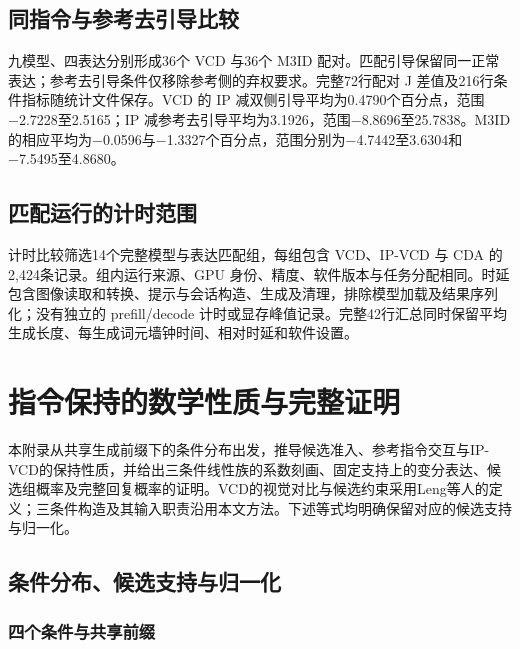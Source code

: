 \subsection{同指令与参考去引导比较}\label{ux540cux6307ux4ee4ux4e0eux53c2ux8003ux53bbux5f15ux5bfcux6bd4ux8f83}

九模型、四表达分别形成36个 VCD 与36个 M3ID 配对。匹配引导保留同一正常表达；参考去引导条件仅移除参考侧的弃权要求。完整72行配对 J 差值及216行条件指标随统计文件保存。VCD 的 IP 减双侧引导平均为0.4790个百分点，范围−2.7228至2.5165；IP 减参考去引导平均为3.1926，范围−8.8696至25.7838。M3ID 的相应平均为−0.0596与−1.3327个百分点，范围分别为−4.7442至3.6304和−7.5495至4.8680。

\subsection{匹配运行的计时范围}\label{ux5339ux914dux8fd0ux884cux7684ux8ba1ux65f6ux8303ux56f4}

计时比较筛选14个完整模型与表达匹配组，每组包含 VCD、IP-VCD 与 CDA 的2,424条记录。组内运行来源、GPU 身份、精度、软件版本与任务分配相同。时延包含图像读取和转换、提示与会话构造、生成及清理，排除模型加载及结果序列化；没有独立的 prefill/decode 计时或显存峰值记录。完整42行汇总同时保留平均生成长度、每生成词元墙钟时间、相对时延和软件设置。

\section{指令保持的数学性质与完整证明}\label{ux6307ux4ee4ux4fddux6301ux7684ux6570ux5b66ux6027ux8d28ux4e0eux5b8cux6574ux8bc1ux660e}

本附录从共享生成前缀下的条件分布出发，推导候选准入、参考指令交互与IP-VCD的保持性质，并给出三条件线性族的系数刻画、固定支持上的变分表达、候选组概率及完整回复概率的证明。VCD的视觉对比与候选约束采用Leng等人的定义\citep{leng2024vcd}；三条件构造及其输入职责沿用本文方法。下述等式均明确保留对应的候选支持与归一化。

\subsection{条件分布、候选支持与归一化}\label{ux6761ux4ef6ux5206ux5e03ux5019ux9009ux652fux6301ux4e0eux5f52ux4e00ux5316}

\subsubsection{四个条件与共享前缀}\label{ux56dbux4e2aux6761ux4ef6ux4e0eux5171ux4eabux524dux7f00}

